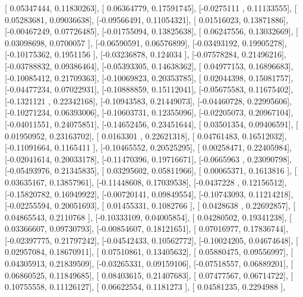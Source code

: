 \documentclass{article}
\begin{document}
       [ 0.05347444,  0.11830263],
       [ 0.06364779,  0.17591745],
       [-0.0275111 ,  0.11133555],
       [ 0.05283681,  0.09036638],
       [-0.09566491,  0.11054321],
       [ 0.01516023,  0.13871886],
       [-0.00467249,  0.07726485],
       [-0.01755094,  0.13825638],
       [ 0.06247556,  0.13032669],
       [ 0.03098698,  0.0700057 ],
       [-0.06590591,  0.06576899],
       [-0.03493192,  0.19905278],
       [-0.10175362,  0.1951156 ],
       [-0.03236878,  0.124034  ],
       [-0.07578284,  0.21496216],
       [-0.03788832,  0.09386464],
       [-0.05393305,  0.14638362],
       [ 0.04977153,  0.16896683],
       [-0.10085412,  0.21709363],
       [-0.10069823,  0.20353785],
       [ 0.02044398,  0.15081757],
       [-0.04477234,  0.07022931],
       [-0.10888859,  0.15112041],
       [-0.05675583,  0.11675402],
       [-0.1321121 ,  0.22342168],
       [-0.10943583,  0.21449073],
       [-0.04460728,  0.22995606],
       [-0.10271234,  0.06393006],
       [-0.10603731,  0.12355096],
       [-0.02205073,  0.20967104],
       [-0.04011551,  0.24075851],
       [-0.14652456,  0.23451644],
       [ 0.03501354,  0.09406591],
       [ 0.01950952,  0.23163702],
       [ 0.0163301 ,  0.22621318],
       [ 0.04761483,  0.16512032],
       [-0.11091664,  0.1165411 ],
       [-0.10465552,  0.20525295],
       [ 0.00258471,  0.22405984],
       [-0.02041614,  0.20033178],
       [-0.11470396,  0.19716671],
       [-0.0665963 ,  0.23090798],
       [-0.05493976,  0.21345835],
       [ 0.03295602,  0.05811966],
       [ 0.00065371,  0.1613816 ],
       [ 0.03635167,  0.13857961],
       [-0.11448608,  0.17039538],
       [-0.0437228 ,  0.12156512],
       [-0.15820782,  0.16949922],
       [-0.00720141,  0.09849554],
       [-0.10743093,  0.11214218],
       [-0.02255594,  0.20051693],
       [ 0.01455331,  0.1082766 ],
       [ 0.0428638 ,  0.22692857],
       [ 0.04865543,  0.2110768 ],
       [-0.10333109,  0.04005854],
       [ 0.04280502,  0.19341238],
       [ 0.03366607,  0.09730793],
       [-0.00854607,  0.18121651],
       [ 0.07016977,  0.17836744],
       [-0.02397775,  0.21797242],
       [-0.04542433,  0.10562772],
       [-0.10024205,  0.04674648],
       [ 0.02957084,  0.18670911],
       [ 0.07510861,  0.13405632],
       [ 0.05880475,  0.09556997],
       [ 0.04305913,  0.21839509],
       [-0.03265331,  0.09159106],
       [-0.07518557,  0.06889201],
       [ 0.06860525,  0.11849685],
       [ 0.08403615,  0.21407683],
       [ 0.07477567,  0.06714722],
       [ 0.10755558,  0.11126127],
       [ 0.06622554,  0.1181273 ],
       [ 0.04581235,  0.2294988 ],
\end{document}
